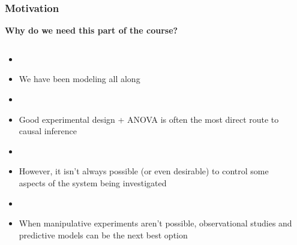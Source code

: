 \documentclass[color=usenames,dvipsnames]{beamer}\usepackage[]{graphicx}\usepackage[]{color}
\begin{document}
\begin{frame}
  \frametitle{Motivation}
  \large
  {\bf Why do we need this part of the course? \par}
  \pause
 \begin{columns}
   \begin{column}{0.75\paperwidth}
  \begin{itemize}%
    \item[]
    \item<2-> We have been modeling all along
    \item[]
    \item<3-> Good experimental design + ANOVA is often the most direct
      route to causal inference
    \item[]
    \item<4-> However, it isn't always possible (or even desirable) to
      control some aspects of the system being investigated
    \item[]
    \item<5-> When manipulative experiments aren't 
      possible, observational studies
      and predictive models can be the next best option
  \end{itemize}
  \end{column}
  \begin{column}{0.19\paperwidth}
\end{column}
\end{columns}
\end{frame}
\end{document}
